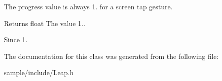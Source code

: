 The progress value is always 1. for a screen tap gesture.

\begin{DoxyReturn}{Returns}
float The value 1.. 
\end{DoxyReturn}
\begin{DoxySince}{Since}
1. 
\end{DoxySince}


The documentation for this class was generated from the following file\+:\begin{DoxyCompactItemize}
\item 
sample/include/Leap.\+h\end{DoxyCompactItemize}
